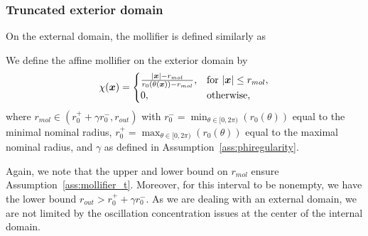 \subsubsection{Truncated exterior domain}\label{subsubsec:truncated-exterior-domain}
On the external domain, the mollifier is defined similarly as
\begin{definition}\label{def:exterior_mollifier}
We define the affine mollifier on the exterior domain by
\begin{equation}
    \chi({{\bm{x}}}) = \begin{cases}\frac{|{{\bm{x}}}| - r_{mol}}{r_0(\theta({{\bm{x}}}))- r_{mol}},&\text{for }|{{\bm{x}}}|\leq r_{mol},\\
    0, & \text{otherwise},
    \end{cases}
    \label{eq:exterior_mollifier}
\end{equation}
where $r_{mol} \in ( r_0^++\gamma r_0^{-}, r_{out})$ with $r_0^-= \min_{\theta\in [0, 2\pi)} \left(r_0(\theta) \right)$ equal to the minimal nominal radius, $r_0^+= \max_{\theta\in [0, 2\pi)} \left(r_0(\theta) \right)$ equal to the maximal nominal radius, and $\gamma$ as defined in Assumption~\ref{ass:phiregularity}.
\end{definition}
Again, we note that the upper and lower bound on $r_{mol}$ ensure Assumption~\ref{ass:mollifier_t}.
Moreover, for this interval to be nonempty, we have the lower bound $r_{out} > r_0^++\gamma r_0^{-}$.
As we are dealing with an external domain, we are not limited by the oscillation concentration issues at the center of the internal domain.